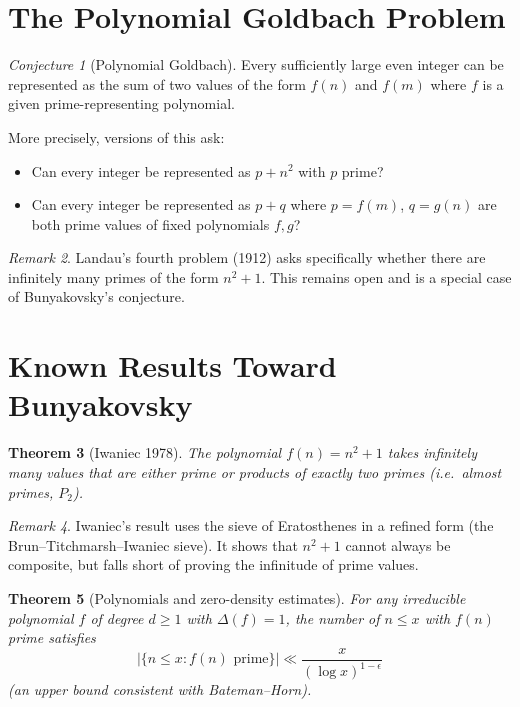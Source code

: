 \documentclass[12pt,a4paper]{amsart}
\newtheorem{theorem}{Theorem}[section]
\theoremstyle{definition}
\theoremstyle{remark}
\newtheorem{remark}[theorem]{Remark}
\newtheorem{conjecture}[theorem]{Conjecture}
\begin{document}
\section{The Polynomial Goldbach Problem}

\begin{conjecture}[Polynomial Goldbach]
\label{conj:polygold}
Every sufficiently large even integer can be represented as the sum of two
values of the form $f(n)$ and $f(m)$ where $f$ is a given prime-representing
polynomial.
\end{conjecture}

More precisely, versions of this ask:
\begin{itemize}[nosep]
  \item Can every integer be represented as $p + n^2$ with $p$ prime?
  \item Can every integer be represented as $p + q$ where $p = f(m)$,
        $q = g(n)$ are both prime values of fixed polynomials $f, g$?
\end{itemize}

\begin{remark}
Landau's fourth problem (1912) asks specifically whether there are infinitely
many primes of the form $n^2 + 1$.
This remains open and is a special case of Bunyakovsky's conjecture.
\end{remark}

\section{Known Results Toward Bunyakovsky}

\begin{theorem}[Iwaniec 1978]
The polynomial $f(n) = n^2 + 1$ takes infinitely many values that are either
prime or products of exactly two primes (i.e.\ almost primes, $P_2$).
\end{theorem}

\begin{remark}
Iwaniec's result uses the sieve of Eratosthenes in a refined form (the
Brun--Titchmarsh--Iwaniec sieve).
It shows that $n^2 + 1$ cannot always be composite, but falls short of proving
the infinitude of prime values.
\end{remark}

\begin{theorem}[Polynomials and zero-density estimates]
For any irreducible polynomial $f$ of degree $d \geq 1$ with $\Delta(f) = 1$,
the number of $n \leq x$ with $f(n)$ prime satisfies
\[
  |\{n \leq x : f(n) \text{ prime}\}| \ll \frac{x}{(\log x)^{1-\epsilon}}
\]
(an upper bound consistent with Bateman--Horn).
\end{theorem}
\end{document}

